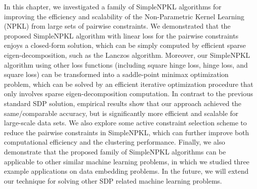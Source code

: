 In this chapter, we investigated a family of SimpleNPKL algorithms for improving the efficiency and scalability of the Non-Parametric Kernel Learning (NPKL) from large sets of pairwise constraints. We demonstrated that the proposed
SimpleNPKL algorithm with linear loss for the pairwise constraints enjoys a closed-form solution, which can be simply computed by efficient sparse eigen-decomposition, such as the Lanczos algorithm. Moreover, our
SimpleNPKL algorithm using other loss functions (including square hinge loss, hinge loss, and square loss) can be transformed into a saddle-point minimax optimization problem, which can be solved by an efficient iterative optimization procedure that only involves sparse
eigen-decomposition computation. In contrast to the previous standard SDP solution, empirical results show that our approach achieved the same/comparable accuracy, but is significantly more efficient and scalable for large-scale data sets. We also explore some active constraint selection scheme to reduce the pairwise constraints in SimpleNPKL, which can further improve both computational efficiency and the clustering performance. Finally, we also demonstrate that the proposed family of SimpleNPKL algorithms can be applicable to other similar machine learning problems, in which we studied three example applications on data embedding problems. In the future, we will extend our technique for solving other SDP related machine learning problems. 